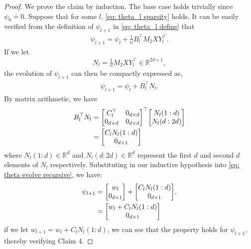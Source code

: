 \documentclass{article}
\newcommand{\R}{\mathbb{R}}
\begin{document}
\begin{proof}
    We prove the claim by induction. The base case holds trivially since $\psi_0 \doteq 0$. Suppose that for some $l$, \eqref{eq: theta_l sparsity} holds. It can be easily verified from the definition of $\psi_{l+1}$ in \eqref{eq: theta_l define} that
    \begin{align}
        \psi_{l+1} = \psi_{l} + \frac{1}{n} B_l^\top M_2 X Y_l^\top. \label{eq: theta evolve recursive}
    \end{align}
    If we let
    \begin{align}
        N_l = \frac{1}{n}M_2XY_l^{\top} \in \R^{2d \times 1},
    \end{align}
    the evolution of $\psi_{l+1}$ can then be compactly expressed as,
    \begin{align}
        \psi_{l+1} = \psi_l + B_l^\top N_l.
    \end{align} 
    By matrix arithmetic, we have 
    \begin{align}
          B_l^\top N_l &= \mqty[C_l^\top & 0_{d\times d} \\ 0_{d \times d} & 0_{d \times d}]^\top \mqty[N_l(1:d) \\ N_l(d:2d)] \\
          &= \mqty[C_l N_l(1:d) \\ 0_{d\times 1}] 
    \end{align}
    where $N_l(1:d)\in \R^d$ and $N_l(d:2d)\in \R^d$ represent the first $d$ and second $d$ elements of $N_l$ respectively. Substituting in our inductive hypothesis into \eqref{eq: theta evolve recursive}, we have:
    \begin{align}
        \psi_{l+1} &=  \mqty[w_l \\ 0_{d\times 1}] + \mqty[C_l N_l(1:d) \\ 0_{d\times 1}], \\
        & = \mqty[w_l + C_l N_l(1:d) \\ 0_{d\times 1}]
    \end{align}
    if we let $w_{l+1} = w_l + C_l N_l(1:d)$, we can see that the property holds for $\psi_{l+1}$,
    thereby verifying Claim 4.
    

\end{proof}
\end{document}
